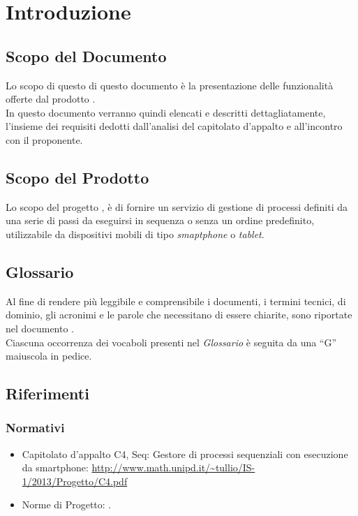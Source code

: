 \section{Introduzione}
\subsection{Scopo del Documento}
Lo scopo di questo di questo documento è la presentazione delle funzionalità offerte dal prodotto \progetto{}.\\
In questo documento verranno quindi elencati e descritti dettagliatamente, l'insieme dei requisiti dedotti dall'analisi del capitolato d'appalto e all'incontro con il proponente.
\subsection{Scopo del Prodotto}
Lo scopo del progetto \progetto{}, è di fornire un servizio di gestione di processi definiti da una serie di passi da eseguirsi in sequenza o senza un ordine predefinito, utilizzabile da dispositivi mobili di tipo \textit{smaptphone} o \textit{tablet}.
\subsection{Glossario}
Al fine di rendere più leggibile e comprensibile i documenti, i termini tecnici, di dominio, gli acronimi e le parole che necessitano di essere chiarite, sono riportate nel documento \Glossario{}.\\
Ciascuna occorrenza dei vocaboli presenti nel \textit{Glossario} è seguita da una ``G'' maiuscola in pedice.
\subsection{Riferimenti}
\subsubsection{Normativi}
\begin{itemize}
\item Capitolato d'appalto C4, Seq: Gestore di processi sequenziali con esecuzione da smartphone:
\url{http://www.math.unipd.it/~tullio/IS-1/2013/Progetto/C4.pdf}
\item Norme di Progetto: \NormeDiProgetto{}.
\end{itemize}
